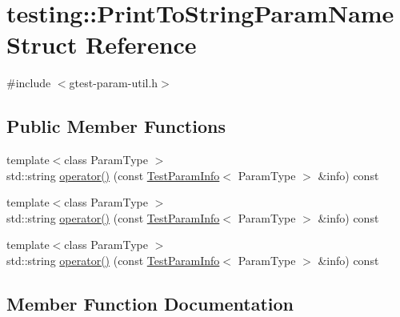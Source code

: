 \hypertarget{structtesting_1_1_print_to_string_param_name}{}\section{testing\+::Print\+To\+String\+Param\+Name Struct Reference}
\label{structtesting_1_1_print_to_string_param_name}


{\ttfamily \#include $<$gtest-\/param-\/util.\+h$>$}

\subsection*{Public Member Functions}
\begin{DoxyCompactItemize}
\item 
{\footnotesize template$<$class Param\+Type $>$ }\\std\+::string \mbox{\hyperlink{structtesting_1_1_print_to_string_param_name_a05b411cfb75dadb2c3c0355aee1dcf21}{operator()}} (const \mbox{\hyperlink{structtesting_1_1_test_param_info}{Test\+Param\+Info}}$<$ Param\+Type $>$ \&info) const
\item 
{\footnotesize template$<$class Param\+Type $>$ }\\std\+::string \mbox{\hyperlink{structtesting_1_1_print_to_string_param_name_a05b411cfb75dadb2c3c0355aee1dcf21}{operator()}} (const \mbox{\hyperlink{structtesting_1_1_test_param_info}{Test\+Param\+Info}}$<$ Param\+Type $>$ \&info) const
\item 
{\footnotesize template$<$class Param\+Type $>$ }\\std\+::string \mbox{\hyperlink{structtesting_1_1_print_to_string_param_name_a05b411cfb75dadb2c3c0355aee1dcf21}{operator()}} (const \mbox{\hyperlink{structtesting_1_1_test_param_info}{Test\+Param\+Info}}$<$ Param\+Type $>$ \&info) const
\end{DoxyCompactItemize}


\subsection{Member Function Documentation}
\mbox{\label{structtesting_1_1_print_to_string_param_name_a05b411cfb75dadb2c3c0355aee1dcf21}} 
